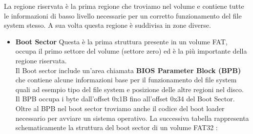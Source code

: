            La regione riservata è la prima regione che troviamo nel volume e contiene tutte le informazioni di basso livello necessarie per un corretto funzionamento del file system stesso. A sua volta questa regione è suddivisa in zone diverse. 
            \begin{itemize}
             \item \textbf{Boot Sector} Questa è la prima struttura presente in un volume FAT, occupa il primo settore del volume  (settore zero) ed è la più importante della regione riservata.\\
	      Il Boot sector include un'area chiamata \textbf{BIOS Parameter Block (BPB)} che contiene alcune informazioni base per il funzionamento del file system quali ad esempio tipo del file system e posizione delle altre regioni nel disco. Il BPB occupa i byte dall'offset 0x1B fino all'offset 0x34 del Boot Sector. \\
	      Oltre al BPB nel boot sector troviamo anche il codice del boot loader necessario per avviare un sistema operativo.
	     La successiva tabella rappresenta schematicamente la struttura del boot sector di un volume FAT32 :
	  

\end{itemize}
